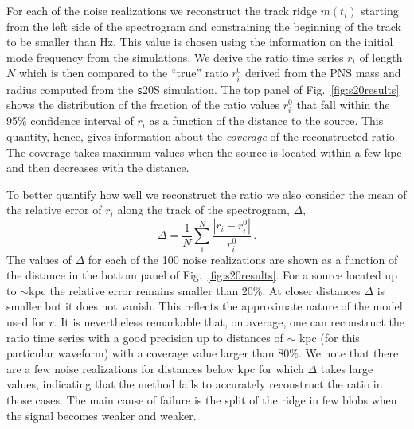 For each of the noise realizations we reconstruct the track ridge $m(t_i)$ starting from the left side of the spectrogram and constraining the beginning of the track to be smaller than \unit[200]{Hz}. This value is chosen using the information on the initial mode frequency from the simulations. We derive the ratio time series $r_i$ of length $N$ which is then compared to the ``true'' ratio {$r_i^0$} derived from the PNS mass and radius computed from the {\texttt s20S} simulation. The top panel of Fig.~\ref{fig:s20results} shows the distribution of the fraction of the ratio values {$r_i^0$} that fall within the 95\% confidence interval of {$r_i$} as a function of the distance to the source. This quantity, hence, gives information about the {\it coverage} of the reconstructed ratio. The coverage takes maximum values when the source is located within a few kpc and then decreases with the distance.

To better quantify how well we reconstruct the ratio we also consider  the mean of the relative error of $r_i$ along 
the track of the spectrogram, $\Delta$,  
\begin{equation}
\Delta=\frac{1}{N}\sum_1^N\frac{|r_i-r_i^0|}{r_i^0}\,.
\end{equation}
The values of $\Delta$ for each of the 100 noise realizations are shown as a function of the distance
in the bottom panel of Fig.~\ref{fig:s20results}. For a source located up to $\sim$\unit[9]{kpc} the relative error
remains smaller than 20\%. At closer distances $\Delta$ is smaller but it does not vanish. This reflects the approximate nature of the model used for $r$. It is nevertheless remarkable that, on average, one can reconstruct the ratio time series with a good
precision up to distances of $\sim$ \unit[9]{kpc} (for this particular waveform) with a coverage value
larger than 80\%. We note that there are a few noise realizations for distances below \unit[9]{kpc} for which
$\Delta$ takes large values, indicating that the method fails to accurately reconstruct the ratio in those cases. The main cause of failure is the split of the ridge in few blobs when the signal becomes weaker and weaker.

